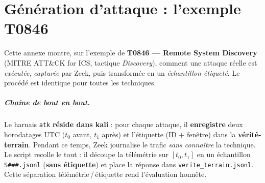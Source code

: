 \chapter{Génération d'attaque : l'exemple T0846}
\label{ann:t0846}

Cette annexe montre, sur l'exemple de \textbf{T0846 — Remote System Discovery}
(MITRE ATT\&CK for ICS, tactique \emph{Discovery}), comment une attaque réelle est
\emph{exécutée}, \emph{capturée} par Zeek, puis transformée en un \emph{échantillon
étiqueté}. Le procédé est identique pour toutes les techniques.

\paragraph{Chaîne de bout en bout.} Le harnais \lstinline|atk| \textbf{réside dans
kali} : pour chaque attaque, il \textbf{enregistre} deux horodatages UTC ($t_0$
avant, $t_1$ après) et l'étiquette (ID + fenêtre) dans la \textbf{vérité-terrain}.
Pendant ce temps, Zeek journalise le trafic \emph{sans connaître} la technique. Le
script recolle le tout : il découpe la télémétrie sur $[t_0,t_1]$ en un échantillon
\lstinline|S###.jsonl| (\textbf{sans étiquette}) et place la réponse dans
\lstinline|verite_terrain.jsonl|. Cette séparation télémétrie\,/\,étiquette rend
l'évaluation honnête.

